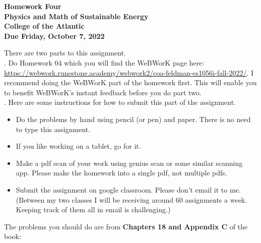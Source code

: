 \documentclass[12pt]{article}
\begin{document}
\pagestyle{empty}
 
\begin{center}
{\LARGE {\bf Homework Four}}\\
\bigskip
{\Large {\bf Physics and Math of Sustainable Energy}}\\
\bigskip
{\Large {\bf College of the Atlantic}}\\
\bigskip
{ {\bf Due Friday, October 7, 2022}}\\ 
\end{center}
\medskip


\noindent There are two parts to this assignment.\\

.  Do Homework 04 which you
will find the WeBWorK page here:
\url{https://webwork.runestone.academy/webwork2/coa-feldman-es1056i-fall-2022/}.
I recommend doing the WeBWorK part of the homework first.  This will
enable you to benefit WeBWorK's instant feedback before you do part
two.\\ 


.  Here are some
instructions for how to submit this part of the assignment.
\begin{itemize}
\item Do the problems by hand using pencil (or pen) and paper.
  There is no need to type this assignment.
\item If you like working on a tablet, go for it. 
\item Make a pdf scan of your work using genius scan or some
  similar scanning app.  Please make the homework into a single
  pdf, not multiple pdfs.
\item Submit the assignment on google classroom.  Please don't
  email it to me.  (Between my two classes I will be receiving
  around 60 assignments a week.  Keeping track of them all in email 
  is challenging.)\\
\end{itemize}

\noindent The problems you should do are from {\bf Chapters 18 and
  Appendix C} of the book:  \\
\end{document}
